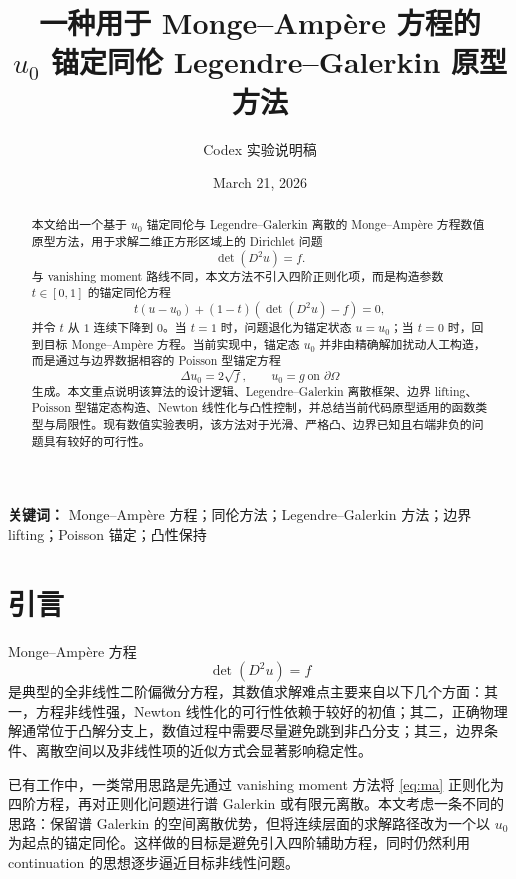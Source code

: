 \documentclass[11pt,a4paper]{article}
\title{一种用于 Monge--Amp\`ere 方程的\\\texorpdfstring{$u_0$}{u0} 锚定同伦 Legendre--Galerkin 原型方法}
\author{Codex 实验说明稿}
\date{March 21, 2026}
\begin{document}
\maketitle

\begin{abstract}
本文给出一个基于 $u_0$ 锚定同伦与 Legendre--Galerkin 离散的 Monge--Amp\`ere 方程数值原型方法，用于求解二维正方形区域上的 Dirichlet 问题
\[
\det(D^2u)=f.
\]
与 vanishing moment 路线不同，本文方法不引入四阶正则化项，而是构造参数 $t\in[0,1]$ 的锚定同伦方程
\[
t(u-u_0)+(1-t)(\det(D^2u)-f)=0,
\]
并令 $t$ 从 $1$ 连续下降到 $0$。当 $t=1$ 时，问题退化为锚定状态 $u=u_0$；当 $t=0$ 时，回到目标 Monge--Amp\`ere 方程。当前实现中，锚定态 $u_0$ 并非由精确解加扰动人工构造，而是通过与边界数据相容的 Poisson 型锚定方程
\[
\Delta u_0 = 2\sqrt{f},
\qquad
u_0=g \ \text{on }\partial\Omega
\]
生成。本文重点说明该算法的设计逻辑、Legendre--Galerkin 离散框架、边界 lifting、Poisson 型锚定态构造、Newton 线性化与凸性控制，并总结当前代码原型适用的函数类型与局限性。现有数值实验表明，该方法对于光滑、严格凸、边界已知且右端非负的问题具有较好的可行性。
\end{abstract}

\noindent\textbf{关键词：}
Monge--Amp\`ere 方程；同伦方法；Legendre--Galerkin 方法；边界 lifting；Poisson 锚定；凸性保持

\section{引言}
Monge--Amp\`ere 方程
\begin{equation}
\det(D^2u)=f
\label{eq:ma}
\end{equation}
是典型的全非线性二阶偏微分方程，其数值求解难点主要来自以下几个方面：其一，方程非线性强，Newton 线性化的可行性依赖于较好的初值；其二，正确物理解通常位于凸解分支上，数值过程中需要尽量避免跳到非凸分支；其三，边界条件、离散空间以及非线性项的近似方式会显著影响稳定性。

已有工作中，一类常用思路是先通过 vanishing moment 方法将 \eqref{eq:ma} 正则化为四阶方程，再对正则化问题进行谱 Galerkin 或有限元离散。本文考虑一条不同的思路：保留谱 Galerkin 的空间离散优势，但将连续层面的求解路径改为一个以 $u_0$ 为起点的锚定同伦。这样做的目标是避免引入四阶辅助方程，同时仍然利用 continuation 的思想逐步逼近目标非线性问题。
\end{document}
